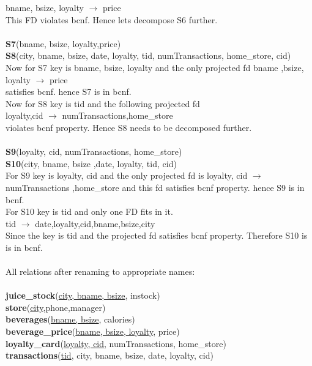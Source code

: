 \documentclass{article}
\begin{document}
\begin{enumerate}
		bname, bsize, loyalty $\rightarrow$ price\\
	  This FD violates bcnf. Hence lets decompose S6 further.\\\\
	  \textbf{S7}(bname, bsize, loyalty,price)\\
	  \textbf{S8}(city, bname, bsize, date, loyalty, tid, numTransactions, home\_store, cid)\\
	  Now for S7 key is bname, bsize, loyalty and the only projected fd bname ,bsize, loyalty $\rightarrow$ price\\ satisfies bcnf.
	  hence S7 is in bcnf.\\
	  Now for S8 key is tid and the following projected fd \\		loyalty,cid $\rightarrow$ numTransactions,home\_store\\
	 violates bcnf property. Hence S8 needs to be decomposed further.\\\\
	   \textbf{S9}(loyalty, cid, numTransactions, home\_store)\\
	   \textbf{S10}(city, bname, bsize ,date, loyalty, tid, cid)\\
	  For S9 key is loyalty, cid and the only projected fd is loyalty, cid $\rightarrow$ numTransactions ,home\_store and this fd satisfies bcnf property.
	  hence S9 is in bcnf.\\
	  For S10 key is tid and only one FD fits in it.\\
		tid $\rightarrow$ date,loyalty,cid,bname,bsize,city\\
	  Since the key is tid and the projected fd satisfies bcnf property. Therefore S10 is is in bcnf.\\\\
	  All relations after renaming to appropriate names:\\\\
		 \textbf{juice\_stock}(\underline{city, bname, bsize}, instock)\\
		 \textbf{store}(\underline{city},phone,manager)\\
		 \textbf{beverages}(\underline{bname, bsize}, calories)\\
		 \textbf{beverage\_price}(\underline{bname, bsize, loyalty}, price)\\
		 \textbf{loyalty\_card}(\underline{loyalty, cid}, numTransactions, home\_store)\\
		 \textbf{transactions}(\underline{tid}, city, bname, bsize, date, loyalty, cid)\\\\

\end{enumerate}
\end{document}
